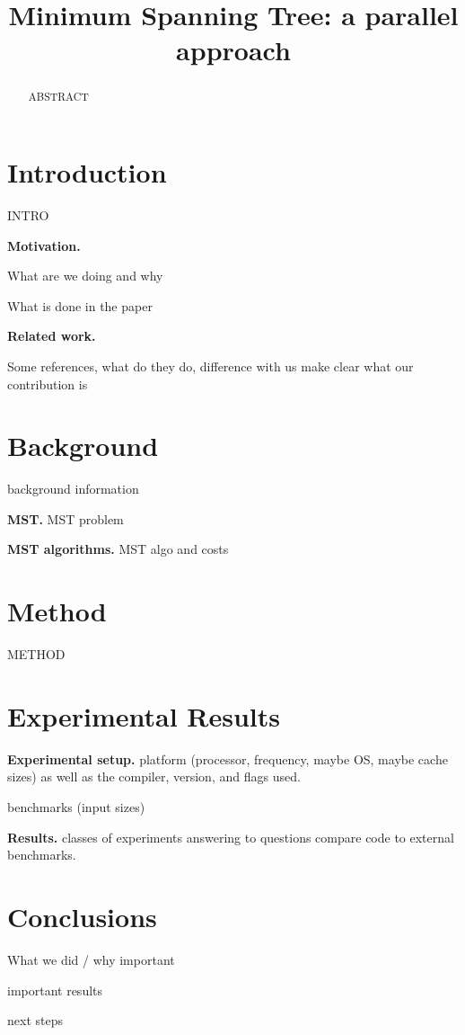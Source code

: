 \documentclass[letterpaper]{article}
\title{Minimum Spanning Tree: a parallel approach}
\newcommand{\mypar}[1]{{\bf #1.}}
\begin{document}
%
\maketitle
%


\begin{abstract}

ABSTRACT

\end{abstract}

\section{Introduction}\label{sec:intro}

INTRO

\mypar{Motivation} 

What are we doing and why

What is done in the paper

\mypar{Related work} 

Some references, what do they do,
difference with us
make clear what our contribution is

\section{Background}\label{sec:background}

background information 

\mypar{MST}
MST problem

\mypar{MST algorithms}
MST algo and costs


\section{Method}\label{sec:yourmethod}

METHOD

\section{Experimental Results}\label{sec:exp}



\mypar{Experimental setup} platform (processor, frequency, maybe OS, maybe cache sizes)
as well as the compiler, version, and flags used. 

benchmarks (input sizes)

\mypar{Results}
classes of experiments answering to questions
compare code to external benchmarks.

\section{Conclusions}

What we did / why important

important results

next steps






\end{document}
